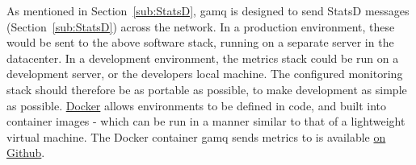 As mentioned in Section~\ref{sub:StatsD}, \gls{gamq} is designed to send StatsD
messages (Section~\ref{sub:StatsD}) across the network. In a production
environment, these would be sent to the above software stack, running on a
separate server in the datacenter. In a development environment, the metrics
stack could be run on a development server, or the developers local machine. The
configured monitoring stack should therefore be as portable as possible, to make
development as simple as possible. \href{https://www.docker.com/}{Docker} allows
environments to be defined in code, and built into container images - which can
be run in a manner similar to that of a lightweight virtual machine. The Docker
container \gls{gamq} sends metrics to is available
\href{https://github.com/FireEater64/docker-statsd-influxdb-grafana}{on Github}.

